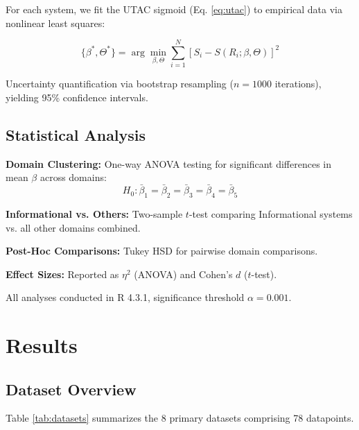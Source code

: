 \documentclass[11pt,a4paper]{article}
\begin{document}
For each system, we fit the UTAC sigmoid (Eq. \ref{eq:utac}) to empirical data via nonlinear least squares:

\begin{equation}
\{\beta^*, \Theta^*\} = \arg\min_{\beta,\Theta} \sum_{i=1}^N \left[ S_i - S(R_i; \beta, \Theta) \right]^2
\end{equation}

Uncertainty quantification via bootstrap resampling ($n = 1000$ iterations), yielding 95\% confidence intervals.

\subsection{Statistical Analysis}

\textbf{Domain Clustering:} One-way ANOVA testing for significant differences in mean $\beta$ across domains:
\begin{equation}
H_0: \bar{\beta}_1 = \bar{\beta}_2 = \bar{\beta}_3 = \bar{\beta}_4 = \bar{\beta}_5
\end{equation}

\textbf{Informational vs. Others:} Two-sample $t$-test comparing Informational systems vs. all other domains combined.

\textbf{Post-Hoc Comparisons:} Tukey HSD for pairwise domain comparisons.

\textbf{Effect Sizes:} Reported as $\eta^2$ (ANOVA) and Cohen's $d$ ($t$-test).

All analyses conducted in R 4.3.1, significance threshold $\alpha = 0.001$.

\section{Results}
\label{sec:results}

\subsection{Dataset Overview}

Table \ref{tab:datasets} summarizes the 8 primary datasets comprising 78 datapoints.
\end{document}
